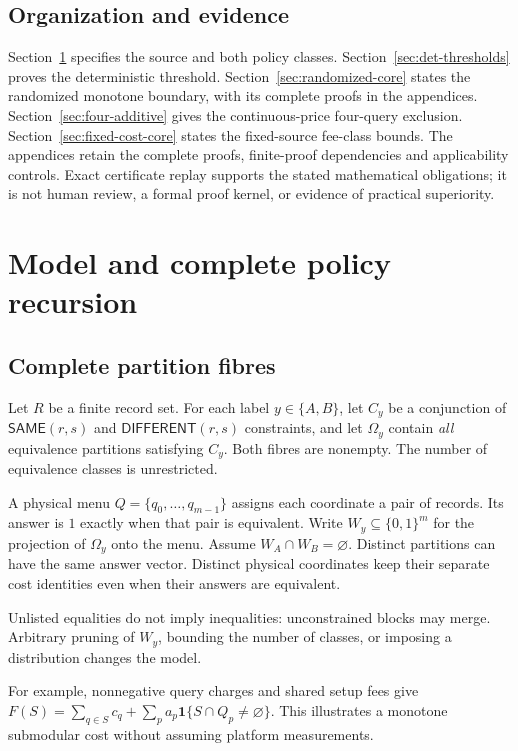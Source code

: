 \documentclass[pdflatex,sn-mathphys-num]{sn-jnl}
\newcommand{\SAME}{\mathsf{SAME}}
\newcommand{\DIFF}{\mathsf{DIFFERENT}}
\theoremstyle{thmstyleone}
\theoremstyle{thmstylethree}
\theoremstyle{thmstyletwo}
\begin{document}
\subsection{Organization and evidence}
Section~\ref{sec:model-core} specifies the source and both policy classes.
Section~\ref{sec:det-thresholds} proves the deterministic threshold.
Section~\ref{sec:randomized-core} states the randomized monotone boundary,
with its complete proofs in the appendices.
Section~\ref{sec:four-additive} gives the continuous-price four-query
exclusion. Section~\ref{sec:fixed-cost-core} states the fixed-source
fee-class bounds. The appendices retain the complete proofs, finite-proof
dependencies and applicability controls. Exact certificate replay supports
the stated mathematical obligations; it is not human review, a formal
proof kernel, or evidence of practical superiority.

\section{Model and complete policy recursion}\label{sec:model-core}
\subsection{Complete partition fibres}
Let $R$ be a finite record set. For each label $y\in\{A,B\}$, let $C_y$ be a conjunction of $\SAME(r,s)$ and $\DIFF(r,s)$ constraints, and let $\Omega_y$ contain \emph{all} equivalence partitions satisfying $C_y$. Both fibres are nonempty. The number of equivalence classes is unrestricted.

A physical menu $Q=\{q_0,\ldots,q_{m-1}\}$ assigns each coordinate a pair of records. Its answer is $1$ exactly when that pair is equivalent. Write $W_y\subseteq\{0,1\}^m$ for the projection of $\Omega_y$ onto the menu. Assume $W_A\cap W_B=\varnothing$. Distinct partitions can have the same answer vector. Distinct physical coordinates keep their separate cost identities even when their answers are equivalent.

Unlisted equalities do not imply inequalities: unconstrained blocks may merge. Arbitrary pruning of $W_y$, bounding the number of classes, or imposing a distribution changes the model.

For example, nonnegative query charges and shared setup fees give
$F(S)=\sum_{q\in S}c_q+\sum_p a_p\mathbf1\{S\cap Q_p\ne\varnothing\}$.
This illustrates a monotone submodular cost without assuming platform measurements.
\end{document}
